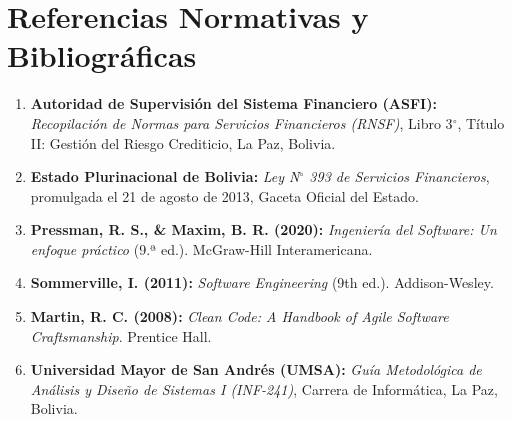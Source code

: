 \documentclass[11pt,letterpaper]{report}
\begin{document}
\section{Referencias Normativas y Bibliográficas}
\begin{enumerate}
    \item \textbf{Autoridad de Supervisión del Sistema Financiero (ASFI):} \textit{Recopilación de Normas para Servicios Financieros (RNSF)}, Libro 3$^\circ$, Título II: Gestión del Riesgo Crediticio, La Paz, Bolivia.
    \item \textbf{Estado Plurinacional de Bolivia:} \textit{Ley N$^\circ$ 393 de Servicios Financieros}, promulgada el 21 de agosto de 2013, Gaceta Oficial del Estado.
    \item \textbf{Pressman, R. S., \& Maxim, B. R. (2020):} \textit{Ingeniería del Software: Un enfoque práctico} (9.ª ed.). McGraw-Hill Interamericana.
    \item \textbf{Sommerville, I. (2011):} \textit{Software Engineering} (9th ed.). Addison-Wesley.
    \item \textbf{Martin, R. C. (2008):} \textit{Clean Code: A Handbook of Agile Software Craftsmanship}. Prentice Hall.
    \item \textbf{Universidad Mayor de San Andrés (UMSA):} \textit{Guía Metodológica de Análisis y Diseño de Sistemas I (INF-241)}, Carrera de Informática, La Paz, Bolivia.
\end{enumerate}
\end{document}
